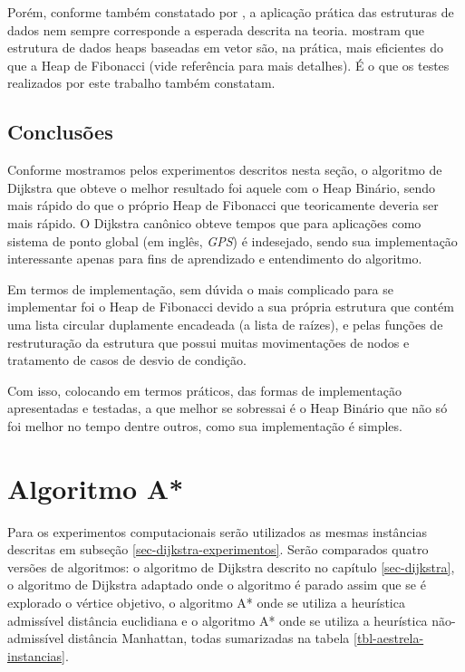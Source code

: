 Porém, conforme também constatado por , a aplicação prática das estruturas de dados nem sempre corresponde a esperada descrita na teoria.  mostram que estrutura de dados heaps baseadas em vetor são, na prática, mais eficientes do que a Heap de Fibonacci (vide referência para mais detalhes). É o que os testes realizados por este trabalho também constatam.

\subsection{Conclusões}
\label{sec-dijkstra-conclusoes}
Conforme mostramos pelos experimentos descritos nesta seção, o algoritmo de Dijkstra que obteve o melhor resultado foi aquele com o Heap Binário, sendo mais rápido do que o próprio Heap de Fibonacci que teoricamente deveria ser mais rápido. O Dijkstra canônico obteve tempos que para aplicações como sistema de ponto global (em inglês, \textit{GPS}) é indesejado, sendo sua implementação interessante apenas para fins de aprendizado e entendimento do algoritmo.

Em termos de implementação, sem dúvida o mais complicado para se implementar foi o Heap de Fibonacci devido a sua própria estrutura que contém uma lista circular duplamente encadeada (a lista de raízes), e pelas funções de restruturação da estrutura que possui muitas movimentações de nodos e tratamento de casos de desvio de condição.

Com isso, colocando em termos práticos, das formas de implementação apresentadas e testadas, a que melhor se sobressai é o Heap Binário que não só foi melhor no tempo dentre outros, como sua implementação é simples.

\section{Algoritmo A*}
\label{sec-aestrela-experimentos}

Para os experimentos computacionais serão utilizados as mesmas instâncias descritas em subseção \ref{sec-dijkstra-experimentos}. Serão comparados quatro versões de algoritmos: o algoritmo de Dijkstra descrito no capítulo \ref{sec-dijkstra}, o algoritmo de Dijkstra adaptado onde o algoritmo é parado assim que se é explorado o vértice objetivo, o algoritmo A* onde se utiliza a heurística admissível distância euclidiana e o algoritmo A* onde se utiliza a heurística não-admissível distância Manhattan, todas sumarizadas na tabela \ref{tbl-aestrela-instancias}.

